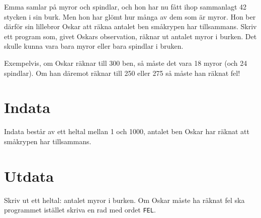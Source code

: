 
Emma samlar på myror och spindlar, och hon har nu fått ihop sammanlagt 42 stycken i sin burk. Men hon har glömt hur många av dem som är myror. Hon ber därför sin lillebror Oskar att räkna antalet ben småkrypen har tillsammans. Skriv ett program som, givet Oskars observation, räknar ut antalet myror i burken. Det skulle kunna vara bara myror eller bara spindlar i bruken.

Exempelvis, om Oskar räknar till 300 ben, så måste det vara 18 myror (och 24 spindlar). Om han däremot räknar till 250 eller 275 så måste han räknat fel!

\section*{Indata}
Indata består av ett heltal mellan 1 och 1000, antalet ben Oskar har räknat att småkrypen har tillsammans.

\section*{Utdata}
Skriv ut ett heltal: antalet myror i burken. Om Oskar måste ha räknat fel ska programmet istället skriva en rad med ordet \texttt{FEL}.
